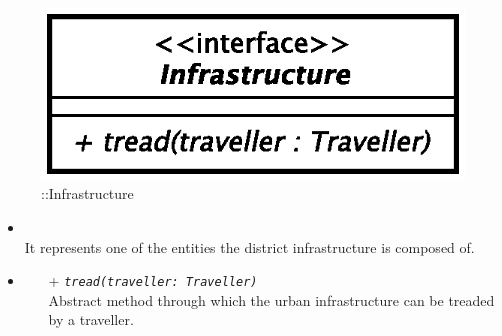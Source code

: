 \begin{figure}[h]
\centering
\includegraphics[scale=0.6,keepaspectratio]{images/solution/app/backend/infrastructure.eps}
\caption{\pReactiveComponent::Infrastructure}
\label{fig:sd-app-infrastructure}
\end{figure}
\FloatBarrier
\begin{itemize}
  \item \textbf{\descr} \\
    It represents one of the entities the district infrastructure is composed
    of.
  \item \textbf{\ops}
  \begin{itemize} 
    \item[+] \texttt{\textit{tread(traveller: Traveller)}} \\
    Abstract method through which the urban infrastructure can be treaded by a
    traveller.
  \end{itemize}
\end{itemize}
